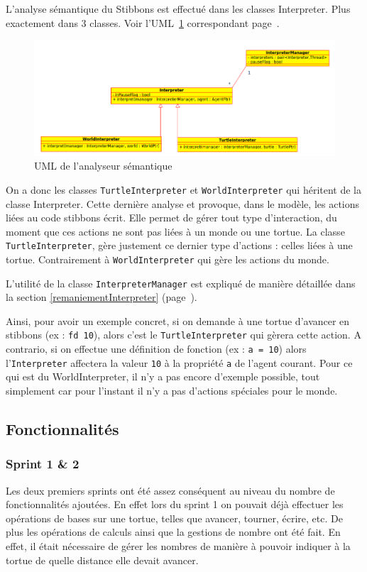 L'analyse sémantique du Stibbons est effectué dans les classes Interpreter. Plus exactement dans 3 classes. Voir l'UML~\ref{interpreterUML} correspondant page~\pageref{interpreterUML}.

\begin{figure}[h]
\caption{\label{interpreterUML} UML de l'analyseur sémantique}
\includegraphics[scale=0.5]{doc/report/uml/interpreterUML.png}
\end{figure}

On a donc les classes \verb|TurtleInterpreter| et \verb|WorldInterpreter| qui héritent de la classe Interpreter. Cette dernière analyse et provoque, dans le modèle, les actions liées au code stibbons écrit. Elle permet de gérer tout type d'interaction, du moment que ces actions ne sont pas liées à un monde ou une tortue. La classe \verb|TurtleInterpreter|, gère justement ce dernier type d'actions : celles liées à une tortue. Contrairement à \verb|WorldInterpreter| qui gère les actions du monde.

L'utilité de la classe \verb|InterpreterManager| est expliqué de manière détaillée dans la section \ref{remaniementInterpreter} (page~\pageref{remaniementInterpreter}).

Ainsi, pour avoir un exemple concret, si on demande à une tortue d'avancer en stibbons (ex : \verb|fd 10|), alors c'est le \verb|TurtleInterpreter| qui gèrera cette action.
A contrario, si on effectue une définition de fonction (ex : \verb|a = 10|) alors l'\verb|Interpreter| affectera la valeur \verb|10| à la propriété \verb|a| de l'agent courant.
Pour ce qui est du WorldInterpreter, il n'y a pas encore d'exemple possible, tout simplement car pour l'instant il n'y a pas d'actions spéciales pour le monde.

\subsection{Fonctionnalités}

\subsubsection{Sprint 1 \& 2}
Les deux premiers sprints ont été assez conséquent au niveau du nombre de fonctionnalités ajoutées.
En effet lors du sprint 1 on pouvait déjà effectuer les opérations de bases sur une tortue, telles que avancer, tourner, écrire, etc. De plus les opérations de calculs ainsi que la gestions de nombre ont été fait. En effet, il était nécessaire de gérer les nombres de manière à pouvoir indiquer à la tortue de quelle distance elle devait avancer.

